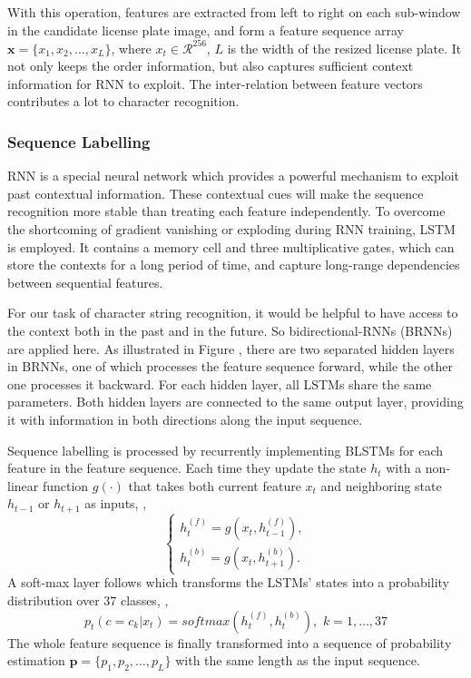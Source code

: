 \documentclass[twocolumn]{svjour3}
\begin{document}
With this operation, features are extracted from left to right on each sub-window in the candidate license plate image, and form a feature sequence array $\textbf{x} = \{x_1,x_2,\dots,x_L\}$, where $x_t \in \mathcal{R}^{256}$, $L$ is the width of the resized license plate.
It not only keeps the order information, but also captures sufficient context information for RNN to exploit. The inter-relation between feature vectors contributes a lot to character recognition.

\subsubsection{Sequence Labelling}%
RNN is a special neural network which provides a powerful mechanism to exploit past contextual information.
These contextual cues will make the sequence recognition more stable than treating each feature independently.  To overcome the shortcoming of gradient vanishing or exploding during RNN training, LSTM is employed. It contains a memory cell and three multiplicative gates, which can store the contexts for a long period of time, and capture long-range dependencies between sequential features.

For our task of character string recognition, it would be helpful to have access to the context both in the past and in the future. So bidirectional-RNNs (BRNNs) are applied here. As illustrated in Figure , there are two separated hidden layers in BRNNs, one of which processes the feature sequence forward, while the other one processes it backward. For each hidden layer, all LSTMs share the same parameters. Both hidden layers are connected to the same output layer, providing it with information in both directions along the input sequence.

Sequence labelling is processed by recurrently implementing BLSTMs for each feature in the feature sequence. Each time they update the state $h_{t}$ with a non-linear function $g(\cdot)$ that takes both current feature $x_t$ and neighboring state $h_{t-1}$ or $h_{t+1}$ as inputs, \ie,
\begin{equation}
\begin{cases}
h_t^{(f)} = g(x_t, h_{t-1}^{(f)}), \\
h_t^{(b)} = g(x_t, h_{t+1}^{(b)}).
\end{cases}
\end{equation}
A soft-max layer follows which transforms the LSTMs' states into a probability distribution over $37$ classes, \ie,
\begin{equation}
p_t(c=c_k | x_t) = softmax(h_t^{(f)},h_t^{(b)}), \,\, k=1,\dots,37
\end{equation}
The whole feature sequence is finally transformed into a sequence of probability estimation $\textbf{p} = \{p_1,p_2,\dots,p_L\}$ with the same length as the input sequence.
\end{document}
